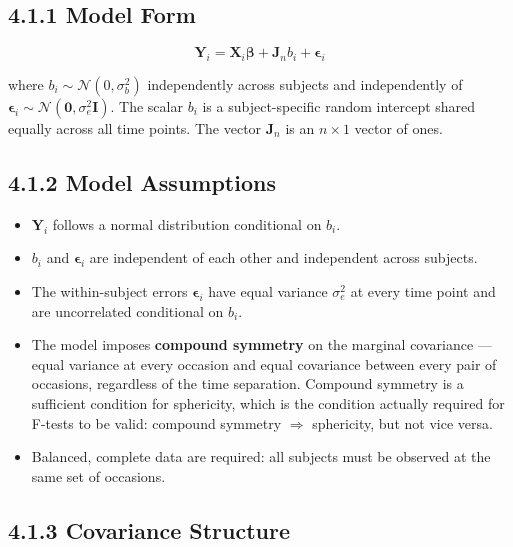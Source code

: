 \documentclass[11pt]{article}
\newcommand{\bY}{\mathbf{Y}}
\newcommand{\bX}{\mathbf{X}}
\newcommand{\bbeta}{\boldsymbol{\beta}}
\newcommand{\bepsilon}{\boldsymbol{\epsilon}}
\newcommand{\Normal}{\mathcal{N}}
\begin{document}
\begin{tcolorbox}[modelbox, title={Model 1: Repeated Measures ANOVA}]
\end{tcolorbox}

\subsection*{4.1.1 Model Form}

$$\bY_i = \bX_i \bbeta + \mathbf{J}_{n} b_i + \bepsilon_i$$

where $b_i \sim \Normal(0, \sigma_b^2)$ independently across subjects and independently of $\bepsilon_i \sim \Normal(\mathbf{0}, \sigma_e^2 \mathbf{I})$. The scalar $b_i$ is a subject-specific random intercept shared equally across all time points. The vector $\mathbf{J}_n$ is an $n \times 1$ vector of ones.

\subsection*{4.1.2 Model Assumptions}

\begin{itemize}[leftmargin=2em]
  \item $\bY_i$ follows a normal distribution conditional on $b_i$.
  \item $b_i$ and $\bepsilon_i$ are independent of each other and independent across subjects.
  \item The within-subject errors $\bepsilon_i$ have equal variance $\sigma_e^2$ at every time point and are uncorrelated conditional on $b_i$.
  \item The model imposes \textbf{compound symmetry} on the marginal covariance — equal variance at every occasion and equal covariance between every pair of occasions, regardless of the time separation. Compound symmetry is a sufficient condition for sphericity, which is the condition actually required for F-tests to be valid: compound symmetry $\Rightarrow$ sphericity, but not vice versa.
  \item Balanced, complete data are required: all subjects must be observed at the same set of occasions.
\end{itemize}

\subsection*{4.1.3 Covariance Structure}
\end{document}
